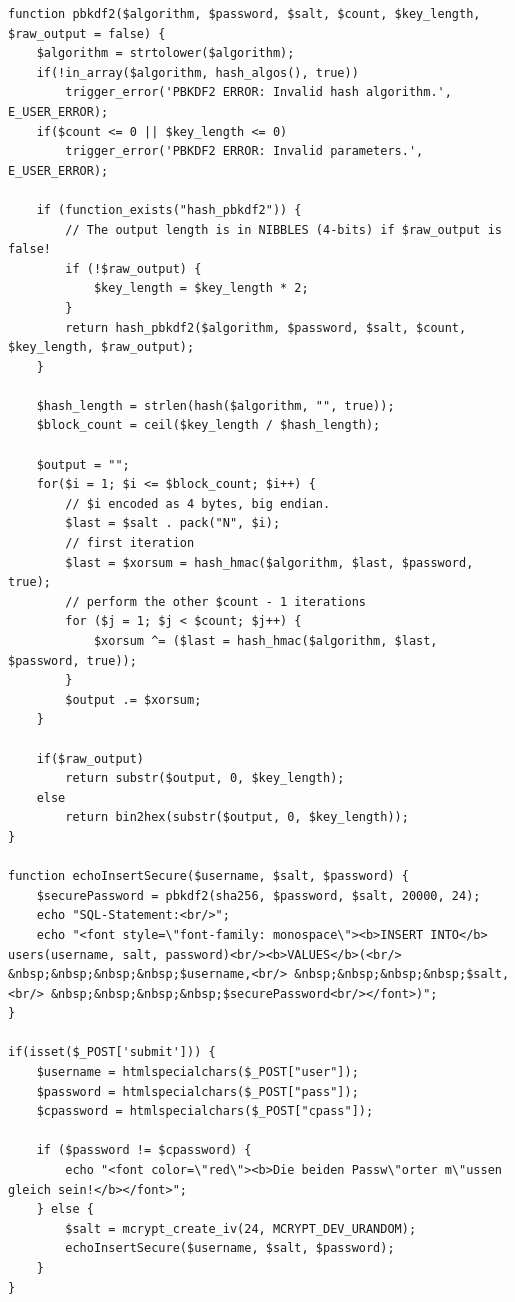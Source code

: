 \documentclass[12pt,a4paper,titlepage,oneside]{scrartcl}
\begin{document}
\begin{lstlisting}[caption=app2b korrigiert,label=code:app2b,style=c]
function pbkdf2($algorithm, $password, $salt, $count, $key_length, $raw_output = false) {
    $algorithm = strtolower($algorithm);
    if(!in_array($algorithm, hash_algos(), true))
        trigger_error('PBKDF2 ERROR: Invalid hash algorithm.', E_USER_ERROR);
    if($count <= 0 || $key_length <= 0)
        trigger_error('PBKDF2 ERROR: Invalid parameters.', E_USER_ERROR);

    if (function_exists("hash_pbkdf2")) {
        // The output length is in NIBBLES (4-bits) if $raw_output is false!
        if (!$raw_output) {
            $key_length = $key_length * 2;
        }
        return hash_pbkdf2($algorithm, $password, $salt, $count, $key_length, $raw_output);
    }

    $hash_length = strlen(hash($algorithm, "", true));
    $block_count = ceil($key_length / $hash_length);

    $output = "";
    for($i = 1; $i <= $block_count; $i++) {
        // $i encoded as 4 bytes, big endian.
        $last = $salt . pack("N", $i);
        // first iteration
        $last = $xorsum = hash_hmac($algorithm, $last, $password, true);
        // perform the other $count - 1 iterations
        for ($j = 1; $j < $count; $j++) {
            $xorsum ^= ($last = hash_hmac($algorithm, $last, $password, true));
        }
        $output .= $xorsum;
    }

    if($raw_output)
        return substr($output, 0, $key_length);
    else
        return bin2hex(substr($output, 0, $key_length));
}

function echoInsertSecure($username, $salt, $password) {
    $securePassword = pbkdf2(sha256, $password, $salt, 20000, 24);
    echo "SQL-Statement:<br/>";
    echo "<font style=\"font-family: monospace\"><b>INSERT INTO</b> users(username, salt, password)<br/><b>VALUES</b>(<br/> &nbsp;&nbsp;&nbsp;&nbsp;$username,<br/> &nbsp;&nbsp;&nbsp;&nbsp;$salt,<br/> &nbsp;&nbsp;&nbsp;&nbsp;$securePassword<br/></font>)";
}

if(isset($_POST['submit'])) {
    $username = htmlspecialchars($_POST["user"]);
    $password = htmlspecialchars($_POST["pass"]);
    $cpassword = htmlspecialchars($_POST["cpass"]);

    if ($password != $cpassword) {
        echo "<font color=\"red\"><b>Die beiden Passw\"orter m\"ussen gleich sein!</b></font>";
    } else {
        $salt = mcrypt_create_iv(24, MCRYPT_DEV_URANDOM);
        echoInsertSecure($username, $salt, $password);
    }
}
\end{lstlisting}
\end{document}
